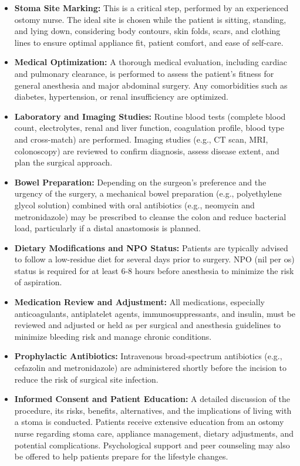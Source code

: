 \begin{itemize}
  \item \textbf{Stoma Site Marking:} This is a critical step, performed by an experienced ostomy nurse. The ideal site is chosen while the patient is sitting, standing, and lying down, considering body contours, skin folds, scars, and clothing lines to ensure optimal appliance fit, patient comfort, and ease of self-care.
  
  \item \textbf{Medical Optimization:} A thorough medical evaluation, including cardiac and pulmonary clearance, is performed to assess the patient's fitness for general anesthesia and major abdominal surgery. Any comorbidities such as diabetes, hypertension, or renal insufficiency are optimized.
  
  \item \textbf{Laboratory and Imaging Studies:} Routine blood tests (complete blood count, electrolytes, renal and liver function, coagulation profile, blood type and cross-match) are performed. Imaging studies (e.g., CT scan, MRI, colonoscopy) are reviewed to confirm diagnosis, assess disease extent, and plan the surgical approach.
  
  \item \textbf{Bowel Preparation:} Depending on the surgeon's preference and the urgency of the surgery, a mechanical bowel preparation (e.g., polyethylene glycol solution) combined with oral antibiotics (e.g., neomycin and metronidazole) may be prescribed to cleanse the colon and reduce bacterial load, particularly if a distal anastomosis is planned.
  
  \item \textbf{Dietary Modifications and NPO Status:} Patients are typically advised to follow a low-residue diet for several days prior to surgery. NPO (nil per os) status is required for at least 6-8 hours before anesthesia to minimize the risk of aspiration.
  
  \item \textbf{Medication Review and Adjustment:} All medications, especially anticoagulants, antiplatelet agents, immunosuppressants, and insulin, must be reviewed and adjusted or held as per surgical and anesthesia guidelines to minimize bleeding risk and manage chronic conditions.
  
  \item \textbf{Prophylactic Antibiotics:} Intravenous broad-spectrum antibiotics (e.g., cefazolin and metronidazole) are administered shortly before the incision to reduce the risk of surgical site infection.
  
  \item \textbf{Informed Consent and Patient Education:} A detailed discussion of the procedure, its risks, benefits, alternatives, and the implications of living with a stoma is conducted. Patients receive extensive education from an ostomy nurse regarding stoma care, appliance management, dietary adjustments, and potential complications. Psychological support and peer counseling may also be offered to help patients prepare for the lifestyle changes.
\end{itemize}

